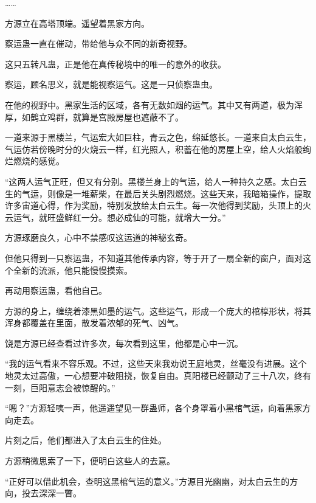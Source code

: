 \begin{this_body}
……

方源立在高塔顶端。遥望着黑家方向。

察运蛊一直在催动，带给他与众不同的新奇视野。

这只五转凡蛊，正是他在真传秘境中的唯一的意外的收获。

察运，顾名思义，就是能视察运气。这是一只侦察蛊虫。

在他的视野中。黑家生活的区域，各有无数如烟的运气。其中又有两道，极为浑厚，如鹤立鸡群，就算是宫殿房屋也遮蔽不了。

一道来源于黑楼兰，气运宏大如巨柱，青云之色，绵延悠长。一道来自太白云生，气运仿若傍晚时分的火烧云一样，红光照人，积蓄在他的房屋上空，给人火焰般绚烂燃烧的感觉。

“这两人运气正旺，但又有分别。黑楼兰身上的气运，给人一种持久之感。太白云生的气运，则像是一堆薪柴，在最后关头剧烈燃烧。这些天来，我暗箱操作，提取许多宙道心得，作为奖励，特别发放给太白云生。每一次他得到奖励，头顶上的火云运气，就旺盛鲜红一分。想必成仙的可能，就增大一分。”

方源琢磨良久，心中不禁感叹这运道的神秘玄奇。

但他只得到一只察运蛊，不知道其他传承内容，等于开了一扇全新的窗户，面对这个全新的流派，他只能慢慢摸索。

再动用察运蛊，看他自己。

方源的身上，缠绕着漆黑如墨的运气。这些运气，形成一个庞大的棺椁形状，将其浑身都覆盖在里面，散发着浓郁的死气、凶气。

饶是方源已经查看过许多次，每次看到这里，他都是心中一沉。

“我的运气看来不容乐观。不过，这些天来我劝说王庭地灵，丝毫没有进展。这个地灵太过高傲，一心想要冲破阻挠，恢复自由。真阳楼已经颤动了三十八次，终有一刻，巨阳意志会被惊醒的。”

“嗯？”方源轻咦一声，他遥遥望见一群蛊师，各个身罩着小黑棺气运，向着黑家方向走去。

片刻之后，他们都进入了太白云生的住处。

方源稍微思索了一下，便明白这些人的去意。

“正好可以借此机会，查明这黑棺气运的意义。”方源目光幽幽，对太白云生的方向，投去深深一瞥。

\end{this_body}

